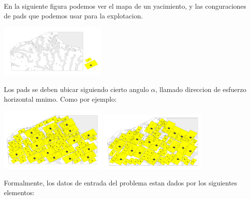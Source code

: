En la siguiente figura podemos ver  el mapa de un yacimiento, y las conguraciones de pads que
podemos usar para la explotacion.

\begin{center}
\includegraphics[width=0.4\textwidth]{imagenes/figura4}
\end{center}

Los pads se deben ubicar siguiendo cierto angulo $\alpha$, llamado direccion de esfuerzo horizontal mnimo.
Como por ejemplo:

\begin{center}
\includegraphics[width=0.4\textwidth]{imagenes/figura5}
\includegraphics[width=0.4\textwidth]{imagenes/figura6}
\end{center}

Formalmente, los datos de entrada del problema estan dados por los siguientes
elementos:

